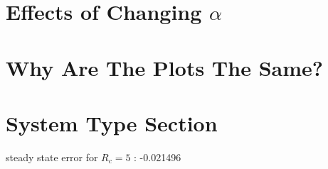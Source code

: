 \section{Effects of Changing $\alpha$} 

\section{Why Are The Plots The Same?}


\section{System Type Section}


steady state error for $R_{c} = 5$ : -0.021496
